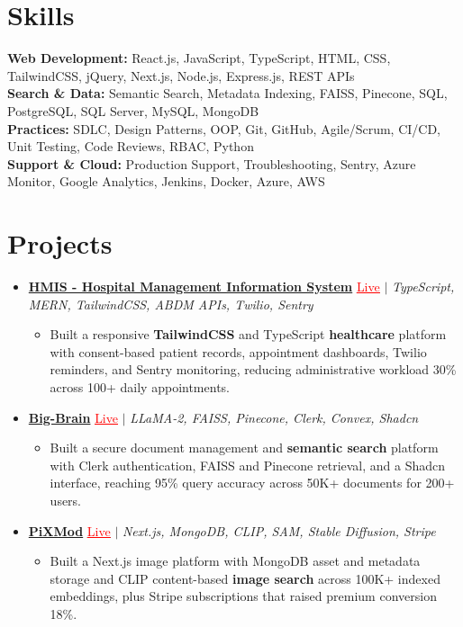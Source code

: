 \documentclass[letterpaper,10pt]{article}
\newcommand{\itemTail}{\vspace{-4pt}}
\newcommand{\sectionGap}{\vspace{-8pt}}
\newcommand{\projGap}{\vspace{3pt}}
\newcommand{\resumeItem}[1]{\item\small{{#1 \itemTail}}}
\newcommand{\resumeProjectHeading}[1]{\item \small #1 \vspace{-2pt}}
\newcommand{\resumeProjectLink}[2]{\href{#1}{\textcolor{red}{\underline{#2}}}}
\newcommand{\resumeSubHeadingListStart}{\begin{itemize}[leftmargin=0.0in, label={}]}
\newcommand{\resumeSubHeadingListEnd}{\end{itemize}}
\newcommand{\resumeProjItemListStart}{\begin{itemize}[leftmargin=0.15in,label=\textbullet,itemsep=3pt,topsep=0pt,parsep=0pt,partopsep=0pt]}
\newcommand{\resumeProjItemListEnd}{\end{itemize}\vspace{-4pt}}
\begin{document}
\section{Skills}
\begin{itemize}[leftmargin=0.15in, label={}]
\small{\item{
\textbf{Web Development:} React.js, JavaScript, TypeScript, HTML, CSS, TailwindCSS, jQuery, Next.js, Node.js, Express.js, REST APIs \\
\textbf{Search \& Data:} Semantic Search, Metadata Indexing, FAISS, Pinecone, SQL, PostgreSQL, SQL Server, MySQL, MongoDB \\
\textbf{Practices:} SDLC, Design Patterns, OOP, Git, GitHub, Agile/Scrum, CI/CD, Unit Testing, Code Reviews, RBAC, Python \\
\textbf{Support \& Cloud:} Production Support, Troubleshooting, Sentry, Azure Monitor, Google Analytics, Jenkins, Docker, Azure, AWS
}}
\end{itemize}
\sectionGap
\section{Projects}
\resumeSubHeadingListStart
\vspace{-2pt}
\resumeProjectHeading{\href{https://hims-rouge.vercel.app/}{\textbf{HMIS - Hospital Management Information System}} \resumeProjectLink{https://hims-rouge.vercel.app/}{Live} $|$ \emph{TypeScript, MERN, TailwindCSS, ABDM APIs, Twilio, Sentry}}
\resumeProjItemListStart
\resumeItem{Built a responsive \textbf{TailwindCSS} and TypeScript \textbf{healthcare} platform with consent-based patient records, appointment dashboards, Twilio reminders, and Sentry monitoring, reducing administrative workload 30\% across 100+ daily appointments.}
\resumeProjItemListEnd
\projGap
\resumeProjectHeading{\href{https://big-brain-pied.vercel.app/}{\textbf{Big-Brain}} \resumeProjectLink{https://big-brain-pied.vercel.app/}{Live} $|$ \emph{LLaMA-2, FAISS, Pinecone, Clerk, Convex, Shadcn}}
\resumeProjItemListStart
\resumeItem{Built a secure document management and \textbf{semantic search} platform with Clerk authentication, FAISS and Pinecone retrieval, and a Shadcn interface, reaching 95\% query accuracy across 50K+ documents for 200+ users.}
\resumeProjItemListEnd
\projGap
\resumeProjectHeading{\href{https://pixmod.vercel.app/}{\textbf{PiXMod}} \resumeProjectLink{https://pixmod.vercel.app/}{Live} $|$ \emph{Next.js, MongoDB, CLIP, SAM, Stable Diffusion, Stripe}}
\resumeProjItemListStart
\resumeItem{Built a Next.js image platform with MongoDB asset and metadata storage and CLIP content-based \textbf{image search} across 100K+ indexed embeddings, plus Stripe subscriptions that raised premium conversion 18\%.}
\resumeProjItemListEnd
\resumeSubHeadingListEnd
\end{document}
